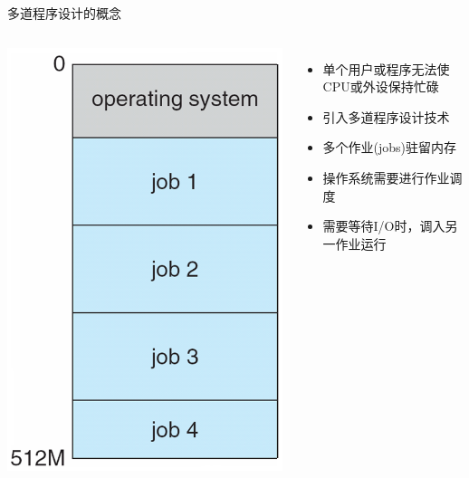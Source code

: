 \documentclass[xcolor=svgnames]{beamer}
\begin{document}
\begin{CJK*}{UTF8}{gbsn}
\begin{frame}{多道程序设计的概念}
\begin{columns}
\includegraphics[width=1.0\textwidth]{jobs.png}
\begin{itemize}
\item 单个用户或程序无法使CPU或外设保持忙碌 
\item 引入多道程序设计技术
\item 多个作业(jobs)驻留内存
\item 操作系统需要进行作业调度
\item 需要等待I/O时，调入另一作业运行
\end{itemize}
\end{columns}
\end{frame}


\end{CJK*}
\end{document}
